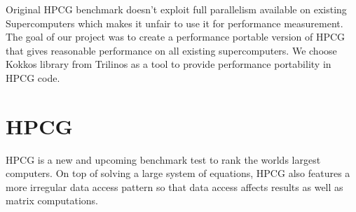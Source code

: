 \documentclass{ccr15}
\begin{document}
Original HPCG benchmark doesn't exploit full parallelism available on existing Supercomputers which makes it unfair to use it for performance measurement.
The goal of our project was to create a performance portable version of HPCG that gives reasonable performance on all existing supercomputers. 
We choose  Kokkos\cite{ZAB:Kokkos} library from Trilinos\cite{ZAB:Trilinos} as a tool to provide performance portability in HPCG code.


\section{HPCG}

HPCG is a new and
upcoming benchmark test to rank the worlds largest computers. On top
of solving a large system of equations, HPCG also features a more irregular data access pattern
so that data access affects results as well as matrix computations.
\end{document}
